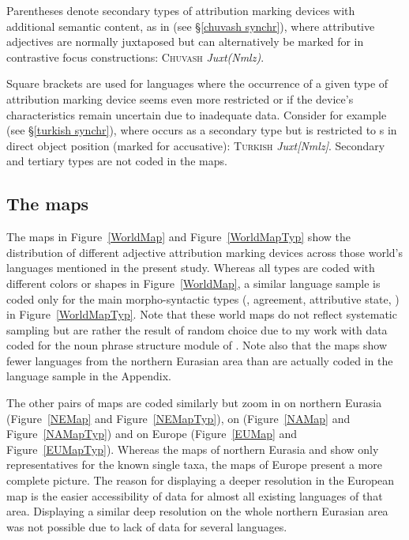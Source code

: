 Parentheses denote secondary types of attribution marking devices with additional semantic content, as in  (see \S\ref{chuvash synchr}), where attributive adjectives are normally juxtaposed but can alternatively be marked for  in contrastive focus constructions: \textsc{Chuvash} \textit{Juxt(Nmlz)}.

Square brackets are used for languages where the occurrence of a given type of attribution marking device seems even more restricted or if the device's characteristics remain uncertain due to inadequate data. Consider for example  (see \S\ref{turkish synchr}), where  occurs as a secondary type but is restricted to s in direct object position (marked for accusative): \textsc{Turkish} \textit{Juxt[Nmlz]}. 
Secondary and tertiary types are not coded in the maps. 

\subsection{The maps}
The maps in Figure~\ref{WorldMap} and Figure~\ref{WorldMapTyp} show the distribution of different adjective attribution marking devices across those world's languages mentioned in the present study. Whereas all types are coded with different colors or shapes in Figure~\ref{WorldMap}, a similar language sample is coded only for the main morpho-syntactic types (, agreement, attributive state, ) in Figure~\ref{WorldMapTyp}. Note that these world maps do not reflect systematic sampling but are rather the result of random choice due to my work with data coded for the noun phrase structure module of  \citep{AUTOTYP-NP}. Note also that the maps show fewer languages from the northern Eurasian area than are actually coded in the language sample in the Appendix.

The other pairs of maps are coded similarly but zoom in on northern Eurasia (Figure~\ref{NEMap} and Figure~\ref{NEMapTyp}), on  (Figure~\ref{NAMap} and Figure~\ref{NAMapTyp}) and on Europe (Figure~\ref{EUMap} and Figure~\ref{EUMapTyp}). Whereas the maps of northern Eurasia and  show only representatives for the known single taxa, the maps of Europe present a more complete picture. The reason for displaying a deeper resolution in the European map is the easier accessibility of data for almost all existing languages of that area. Displaying a similar deep resolution on the whole northern Eurasian area was not possible due to lack of data for several languages.

